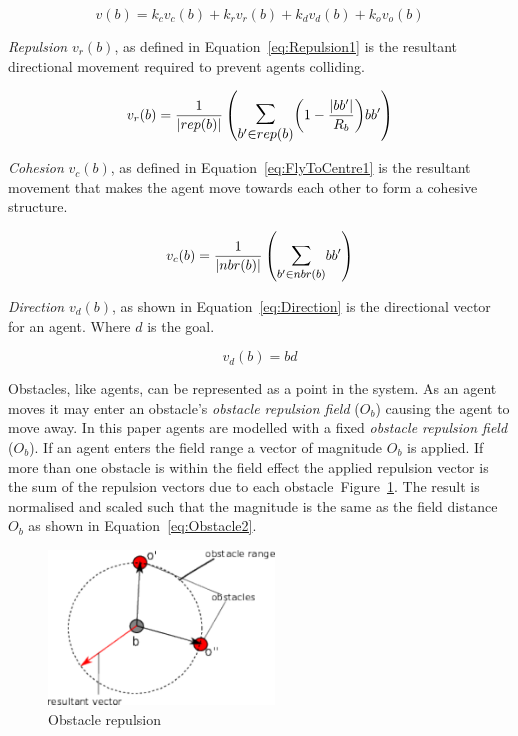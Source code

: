 \documentclass{ieeeaccess}
\begin{document}
\begin{equation}\label{eq:BotPhysics1}
  v(b) = k_cv_c(b) + k_rv_r(b) + k_dv_d(b) + k_ov_o(b)
\end{equation}

\textit{Repulsion} $v_{r}(b)$, as defined in Equation~\ref{eq:Repulsion1} is the resultant directional movement required to prevent agents colliding.

\begin{equation}\label{eq:Repulsion1}
v_{r}(b) = 
\frac{1}{|rep(b)|}
\left(
\mathlarger{\mathlarger{\sum_{b' \in rep(b)}}}
{\left( 1-\frac{|bb'|}{R_b} \right)}
{bb'}
\right)
\end{equation}

\textit{Cohesion} $v_{c}(b)$, as defined in Equation~\ref{eq:FlyToCentre1} is the resultant movement that makes the agent move towards each other to form a cohesive structure.

\begin{equation}\label{eq:FlyToCentre1}
v_{c}(b) = \frac{1}{|nbr(b)|}\left({\mathlarger{\sum_{b' \in nbr(b)}}{bb'}}\right)
\end{equation}

\textit{Direction} $v_d(b)$, as shown in Equation~\ref{eq:Direction} is the directional vector for an agent. Where $d$ is the goal.

\begin{equation}
\label{eq:Direction}
v_d(b) = bd
\end{equation}

Obstacles, like agents, can be represented as a point in the system. As an agent moves it may enter an obstacle's \textit{obstacle repulsion field} ($O_b$) causing the agent to move away. In this paper agents are modelled with a fixed \textit{obstacle repulsion field} ($O_b$). If an agent enters the field range a vector of magnitude $O_b$ is applied. If more than one obstacle is within the field effect the applied repulsion vector is the sum of the repulsion vectors due to each obstacle~Figure~\ref{methods:Obstacle1}. The result is normalised and scaled such that the magnitude is the same as the field distance~$O_b$ as shown in Equation~\ref{eq:Obstacle2}.

\begin{figure}[H]
\begin{center}
\includegraphics[width=6cm]{figures/Obstacle1}
\end{center}
\caption{Obstacle repulsion \label{methods:Obstacle1}}
\end{figure}
\end{document}
